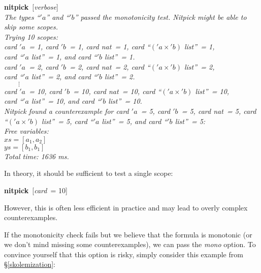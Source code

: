 \documentclass[a4paper,12pt]{article}
\begin{document}
\prew
\textbf{nitpick}~[\textit{verbose}] \\[2\smallskipamount]
\slshape
The types ``\kern1pt$'a$'' and ``\kern1pt$'b$'' passed the monotonicity test.
Nitpick might be able to skip some scopes.
 \\[2\smallskipamount]
Trying 10 scopes: \\
\hbox{}\qquad \textit{card} $'a$~= 1, \textit{card} $'b$~= 1,
\textit{card} \textit{nat}~= 1, \textit{card} ``$('a \times {'}b)$
\textit{list\/}''~= 1, \\
\hbox{}\qquad\quad \textit{card} ``\kern1pt$'a$ \textit{list\/}''~= 1, and
\textit{card} ``\kern1pt$'b$ \textit{list\/}''~= 1. \\
\hbox{}\qquad \textit{card} $'a$~= 2, \textit{card} $'b$~= 2,
\textit{card} \textit{nat}~= 2, \textit{card} ``$('a \times {'}b)$
\textit{list\/}''~= 2, \\
\hbox{}\qquad\quad \textit{card} ``\kern1pt$'a$ \textit{list\/}''~= 2, and
\textit{card} ``\kern1pt$'b$ \textit{list\/}''~= 2. \\
\hbox{}\qquad $\qquad\vdots$ \\[.5\smallskipamount]
\hbox{}\qquad \textit{card} $'a$~= 10, \textit{card} $'b$~= 10,
\textit{card} \textit{nat}~= 10, \textit{card} ``$('a \times {'}b)$
\textit{list\/}''~= 10, \\
\hbox{}\qquad\quad \textit{card} ``\kern1pt$'a$ \textit{list\/}''~= 10, and
\textit{card} ``\kern1pt$'b$ \textit{list\/}''~= 10.
\\[2\smallskipamount]
Nitpick found a counterexample for
\textit{card} $'a$~= 5, \textit{card} $'b$~= 5,
\textit{card} \textit{nat}~= 5, \textit{card} ``$('a \times {'}b)$
\textit{list\/}''~= 5, \textit{card} ``\kern1pt$'a$ \textit{list\/}''~= 5, and
\textit{card} ``\kern1pt$'b$ \textit{list\/}''~= 5:
\\[2\smallskipamount]
\hbox{}\qquad Free variables: \nopagebreak \\
\hbox{}\qquad\qquad $\textit{xs} = [a_1, a_2]$ \\
\hbox{}\qquad\qquad $\textit{ys} = [b_1, b_1]$ \\[2\smallskipamount]
Total time: 1636 ms.
\postw

In theory, it should be sufficient to test a single scope:

\prew
\textbf{nitpick}~[\textit{card}~= 10]
\postw

However, this is often less efficient in practice and may lead to overly complex
counterexamples.

If the monotonicity check fails but we believe that the formula is monotonic (or
we don't mind missing some counterexamples), we can pass the
\textit{mono} option. To convince yourself that this option is risky,
simply consider this example from \S\ref{skolemization}:
\end{document}
